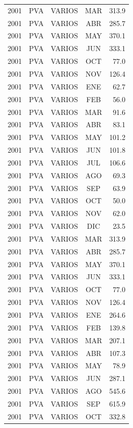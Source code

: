 \documentclass[12pt,]{article}
\begin{document}
\begin{table}[ht]
{\begin{tabular}{lcccr}
  2001 & PVA & VARIOS & MAR & 313.9 \\ 
  2001 & PVA & VARIOS & ABR & 285.7 \\ 
  2001 & PVA & VARIOS & MAY & 370.1 \\ 
  2001 & PVA & VARIOS & JUN & 333.1 \\ 
  2001 & PVA & VARIOS & OCT & 77.0 \\ 
  2001 & PVA & VARIOS & NOV & 126.4 \\ 
  2001 & PVA & VARIOS & ENE & 62.7 \\ 
  2001 & PVA & VARIOS & FEB & 56.0 \\ 
  2001 & PVA & VARIOS & MAR & 91.6 \\ 
  2001 & PVA & VARIOS & ABR & 83.1 \\ 
  2001 & PVA & VARIOS & MAY & 101.2 \\ 
  2001 & PVA & VARIOS & JUN & 101.8 \\ 
  2001 & PVA & VARIOS & JUL & 106.6 \\ 
  2001 & PVA & VARIOS & AGO & 69.3 \\ 
  2001 & PVA & VARIOS & SEP & 63.9 \\ 
  2001 & PVA & VARIOS & OCT & 50.0 \\ 
  2001 & PVA & VARIOS & NOV & 62.0 \\ 
  2001 & PVA & VARIOS & DIC & 23.5 \\ 
  2001 & PVA & VARIOS & MAR & 313.9 \\ 
  2001 & PVA & VARIOS & ABR & 285.7 \\ 
  2001 & PVA & VARIOS & MAY & 370.1 \\ 
  2001 & PVA & VARIOS & JUN & 333.1 \\ 
  2001 & PVA & VARIOS & OCT & 77.0 \\ 
  2001 & PVA & VARIOS & NOV & 126.4 \\ 
  2001 & PVA & VARIOS & ENE & 264.6 \\ 
  2001 & PVA & VARIOS & FEB & 139.8 \\ 
  2001 & PVA & VARIOS & MAR & 207.1 \\ 
  2001 & PVA & VARIOS & ABR & 107.3 \\ 
  2001 & PVA & VARIOS & MAY & 78.9 \\ 
  2001 & PVA & VARIOS & JUN & 287.1 \\ 
  2001 & PVA & VARIOS & AGO & 545.6 \\ 
  2001 & PVA & VARIOS & SEP & 615.9 \\ 
  2001 & PVA & VARIOS & OCT & 332.8 \\ 

\end{tabular}}
\end{table}
\end{document}
